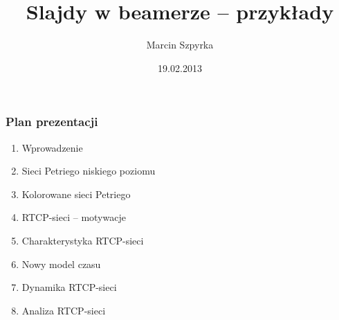 \documentclass{beamer}
\title[Slajdy w beamerze]{Slajdy w beamerze -- przykłady}
\author[M. Szpyrka.]{Marcin Szpyrka}
\date[2013]{19.02.2013}
\institute[AGH-UST]
{Wydział EAIiIB\\ 
Katedra Informatyki Stosowanej
}
\begin{document}
\begin{frame}
   \titlepage
\end{frame}


\begin{frame}
\frametitle{Plan prezentacji}
\transblindshorizontal

\begin{enumerate}
\item Wprowadzenie
\item Sieci Petriego niskiego poziomu
\item Kolorowane sieci Petriego
\item RTCP-sieci -- motywacje 
\item Charakterystyka RTCP-sieci
\item Nowy model czasu
\item Dynamika RTCP-sieci
\item Analiza RTCP-sieci
\end{enumerate}
\end{frame}

\end{document}
